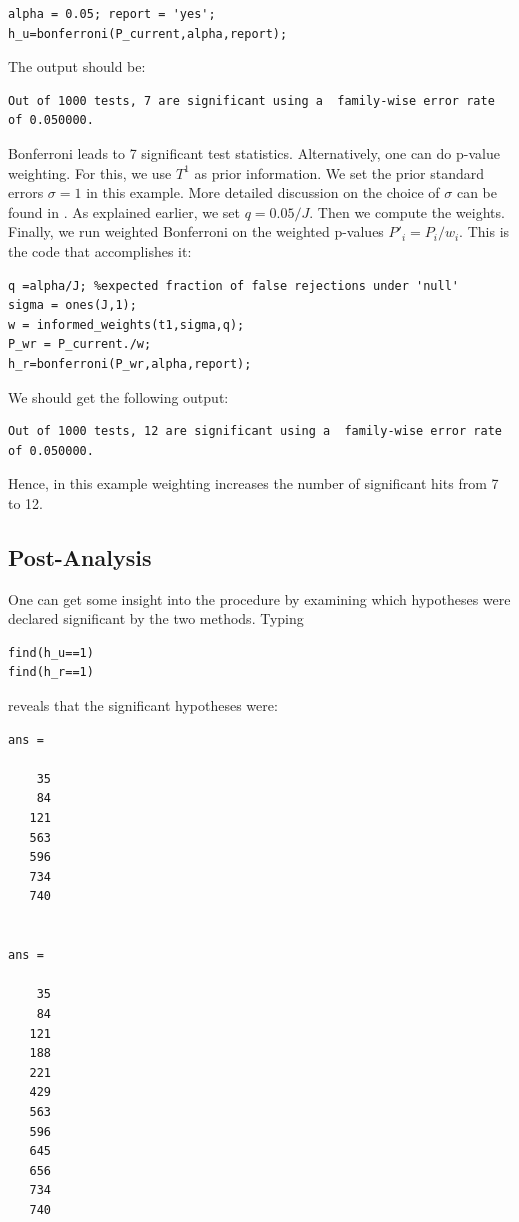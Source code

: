 \documentclass[english,11pt]{article} %
\begin{document}
\begin{verbatim}
alpha = 0.05; report = 'yes';
h_u=bonferroni(P_current,alpha,report);
\end{verbatim}
The output should be:

\begin{verbatim}
Out of 1000 tests, 7 are significant using a  family-wise error rate  of 0.050000.
\end{verbatim}

Bonferroni leads to 7 significant test statistics. Alternatively, one can do p-value weighting. For this, we use $T^1$ as prior information. We set the prior standard errors $\sigma=1$ in this example. More detailed discussion on the choice of $\sigma$ can be found in \citep{dobriban2015optimal}. As explained earlier, we set $q  = 0.05/J$. Then we compute the weights. Finally, we run weighted Bonferroni on the weighted p-values $P'_i = P_i/w_i$. This is the code that accomplishes it:


\begin{verbatim}
q =alpha/J; %expected fraction of false rejections under 'null'
sigma = ones(J,1);
w = informed_weights(t1,sigma,q);
P_wr = P_current./w;
h_r=bonferroni(P_wr,alpha,report);
\end{verbatim}

We should get the following output:

\begin{verbatim}
Out of 1000 tests, 12 are significant using a  family-wise error rate  of 0.050000.
\end{verbatim}

Hence, in this example weighting increases the number of significant hits from 7 to 12.

\subsection{Post-Analysis}

One can get some insight into the procedure by examining which hypotheses were declared significant by the two methods. Typing

\begin{verbatim}
find(h_u==1)
find(h_r==1)
\end{verbatim}

reveals that the significant hypotheses were:

\begin{verbatim}
ans =

    35
    84
   121
   563
   596
   734
   740


ans =

    35
    84
   121
   188
   221
   429
   563
   596
   645
   656
   734
   740
\end{verbatim}
\end{document}

